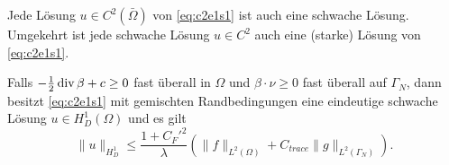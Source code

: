 \documentclass[../skript.tex]{subfiles}
\begin{document}
\begin{remark} %
\label{bem:c2e2s6}
Jede Lösung $u \in C^2(\bar{\Omega})$ von \cref{eq:c2e1s1} ist auch eine schwache Lösung.
Umgekehrt ist jede schwache Lösung $u \in C^2$ auch eine (starke) Lösung von \cref{eq:c2e1s1}.
\end{remark}
\begin{theorem} %
\label{thm:c2e2s7}
Falls $- \frac{1}{2} \operatorname{div} \beta + c \geq 0$ fast überall in $\Omega$ und $\beta \cdot \nu \geq 0$ fast überall auf $\Gamma_N$, dann besitzt \cref{eq:c2e1s1} mit gemischten Randbedingungen  eine eindeutige schwache Lösung $u \in H_D^1(\Omega)$ und es gilt
\[
	\| u \|_{H^1_D} \leq \frac{1 + {C_F'}^2}{\lambda} \left( \| f \|_{L^2(\Omega)} + C_{trace} \| g \|_{L^2(\Gamma_N)} \right).
\]  
\end{theorem}
\end{document}
